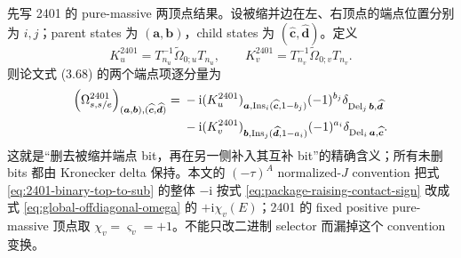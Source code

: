 \documentclass[11pt,a4paper]{ctexart}
\newcommand{\ii}{\mathrm i}
\begin{document}
先写 2401 的 pure-massive 两顶点结果。设被缩并边在左、右顶点的端点位置分别为 $i,j$；parent states 为 $(\bm a,\bm b)$，child states 为 $(\widehat{\bm c},\widehat{\bm d})$。定义
\begin{equation}
 K_u^{2401}=T_{n_u}^{-1}\widetilde\Omega_{0;u}T_{n_u},
 \qquad
 K_v^{2401}=T_{n_v}^{-1}\widetilde\Omega_{0;v}T_{n_v}.
 \label{eq:component-log-kernel}
\end{equation}
则论文式 (3.68) 的两个端点项逐分量为
\begin{align}
 \left(\Omega_{s,s/e}^{2401}\right)_{(\bm a,\bm b),(\widehat{\bm c},\widehat{\bm d})}
={}&-\ii
 (K_u^{2401})_{\bm a,\operatorname{Ins}_i(\widehat{\bm c},1-b_j)}
 (-1)^{b_j}
 \delta_{\operatorname{Del}_j\bm b,\widehat{\bm d}}
 \notag\\
 &-\ii
 (K_v^{2401})_{\bm b,\operatorname{Ins}_j(\widehat{\bm d},1-a_i)}
 (-1)^{a_i}
 \delta_{\operatorname{Del}_i\bm a,\widehat{\bm c}}.
 \label{eq:2401-binary-top-to-sub}
\end{align}
这就是“删去被缩并端点 bit，再在另一侧补入其互补 bit”的精确含义；所有未删 bits 都由 Kronecker delta 保持。本文的 $(-\tau)^A$ normalized-$J$ convention 把式 \eqref{eq:2401-binary-top-to-sub} 的整体 $-\ii$ 按式 \eqref{eq:package-raising-contact-sign} 改成式 \eqref{eq:global-offdiagonal-omega} 的 $+\ii\chi_v(E)$；2401 的 fixed positive pure-massive 顶点取 $\chi_v=\varsigma_v=+1$。不能只改二进制 selector 而漏掉这个 convention 变换。
\end{document}
